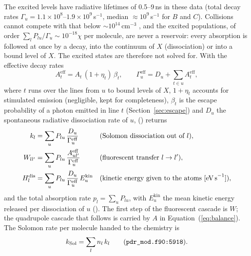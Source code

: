 The excited levels have radiative lifetimes of 0.5--9\,ns in these data
(total decay rates $\Gamma_u=1.1\times10^8$--$1.9\times10^9$\,s$^{-1}$, median
$\approx10^9$\,s$^{-1}$ for $B$ and $C$). Collisions cannot compete with that below
$\sim10^{14}$\,cm$^{-3}$ \citep{Shaw2005}, and the excited populations, of order
$\sum_lP_{lu}/\Gamma_u\sim10^{-18}\chi$ per molecule, are never a reservoir: every
absorption is followed at once by a decay, into the continuum of $X$
(dissociation) or into a bound level of $X$. The excited states are therefore
not solved for. With the effective decay rates
\begin{equation}
  A^{\mathrm{eff}}_t = A_t\,(1+\eta_t)\,\beta_t,
  \qquad
  \Gamma^{\mathrm{eff}}_u = D_u + \sum_{t\in u} A^{\mathrm{eff}}_t ,
  \label{eq:aeff}
\end{equation}
where $t$ runs over the lines from $u$ to bound levels of $X$, $1+\eta_t$
accounts for stimulated emission (negligible, kept for completeness), $\beta_t$
is the escape probability of a photon emitted in line $t$
(Section~\ref{sec:escape}) and $D_u$ the spontaneous radiative dissociation rate
of $u$,  () returns
\begin{align}
  k_l &= \sum_u P_{lu}\,\frac{D_u}{\Gamma^{\mathrm{eff}}_u}
       && \text{(Solomon dissociation out of } l\text{)},\\
  W_{ll'} &= \sum_u P_{lu}\,\frac{A^{\mathrm{eff}}_{ul'}}{\Gamma^{\mathrm{eff}}_u}
       && \text{(fluorescent transfer } l\to l'\text{)},\\
  H^{\mathrm{dis}}_l &= \sum_u P_{lu}\,\frac{D_u}{\Gamma^{\mathrm{eff}}_u}\,E^{\mathrm{kin}}_u
       && \text{(kinetic energy given to the atoms [eV\,s}^{-1}\text{])},
\end{align}
and the total absorption rate $p_l=\sum_u P_{lu}$, with $E^{\mathrm{kin}}_u$ the
mean kinetic energy released per dissociation of $u$ ().
The first step of the fluorescent cascade is $W$; the quadrupole cascade that
follows is carried by $A$ in Equation~(\ref{eq:balance}). The Solomon rate per
molecule handed to the chemistry is
\begin{equation}
  k_{\mathrm{Sol}} = \sum_l n_l\,k_l
  \qquad(\text{\src{pdr\_mod.f90:\allowbreak{}5918}}).
  \label{eq:ksol}
\end{equation}

